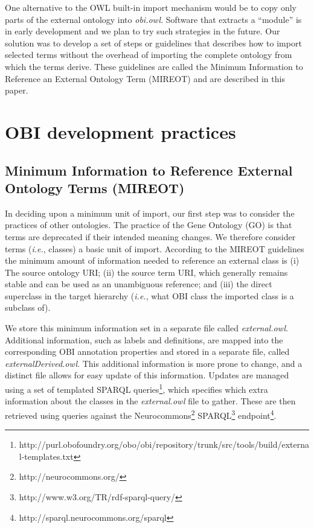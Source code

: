 \documentclass{elsart}       %
\begin{document}
One alternative to the OWL built-in import mechanism would be to copy only parts of the external ontology into \emph{obi.owl}. Software that extracts a ``module''\cite{module} is in early development and we plan to try such strategies in the future. %
Our solution was to develop a set of steps or guidelines that describes how to import selected terms without the overhead of importing the complete ontology from which the terms derive.
These guidelines are called the Minimum Information to Reference an External Ontology Term (MIREOT) and are described in this paper.

\section{OBI development practices}


\subsection{Minimum Information to Reference External Ontology Terms (MIREOT)}

In deciding upon a minimum unit of import, our first step was to consider the practices of other ontologies.
The practice of the Gene Ontology (GO)\cite{go} is that terms are deprecated if their intended meaning changes\cite{deprecated}.
We therefore consider terms (\emph{i.e.}, classes) a basic unit of import.
According to the MIREOT guidelines the minimum amount of information needed to reference an external class is (i) The source ontology URI; (ii) the source term URI, which generally remains stable and can be used as an unambiguous reference; and (iii) the direct superclass in the target hierarchy (\emph{i.e.}, what OBI class the imported class is a subclass of).

We store this minimum information set in a separate file called \emph{external.owl}. 
Additional information, such as labels and definitions, are mapped into the corresponding OBI annotation properties and stored in a separate file, called \emph{externalDerived.owl}. This additional information is more prone to change, and a distinct file allows for easy update of this information.
Updates are managed using a set of templated SPARQL queries\footnote{http://purl.obofoundry.org/obo/obi/repository/trunk/src/tools/build/external-templates.txt}, which specifies which extra information about the classes in the \emph{external.owl} file to gather.
These are then retrieved using queries against the Neurocommons\footnote{http://neurocommons.org/} SPARQL\footnote{http://www.w3.org/TR/rdf-sparql-query/} endpoint\footnote{http://sparql.neurocommons.org/sparql}.%
\end{document}

